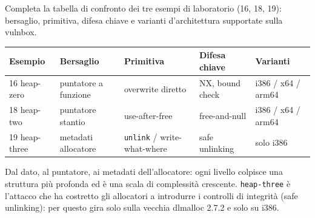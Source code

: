 \question[5]
Completa la tabella di confronto dei tre esempi di laboratorio (16, 18, 19): bersaglio, primitiva, difesa chiave e varianti d'architettura supportate sulla vulnbox.
\begin{solution}
\begin{center}\small
\begin{tabular}{@{}lllll@{}}
\toprule
Esempio & Bersaglio & Primitiva & Difesa chiave & Varianti\\
\midrule
16 heap-zero  & puntatore a funzione & overwrite diretto      & NX, bound check   & i386 / x64 / arm64\\
18 heap-two   & puntatore stantio    & use-after-free         & free-and-null     & i386 / x64 / arm64\\
19 heap-three & metadati allocatore  & \lstinline|unlink| / write-what-where & safe unlinking & solo i386\\
\bottomrule
\end{tabular}
\end{center}
Dal dato, al puntatore, ai metadati dell'allocatore: ogni livello colpisce una struttura più profonda ed è una scala di complessità crescente. \lstinline|heap-three| è l'attacco che ha costretto gli allocatori a introdurre i controlli di integrità (safe unlinking): per questo gira solo sulla vecchia dlmalloc 2.7.2 e solo su i386.
\end{solution}
